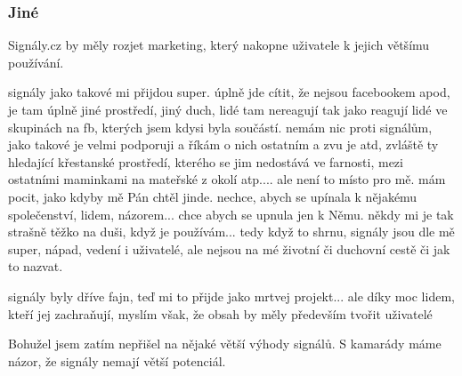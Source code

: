 \subsubsection{Jiné}

Signály.cz by měly rozjet marketing, který nakopne uživatele k jejich většímu používání.

signály jako takové mi přijdou super. úplně jde cítit, že nejsou facebookem apod, je tam úplně jiné prostředí, jiný duch, lidé tam nereagují tak jako reagují lidé ve skupinách na fb, kterých jsem kdysi byla součástí. nemám nic proti signálům, jako takové je velmi podporuji a říkám o nich ostatním a zvu je atd, zvláště ty hledající křestanské prostředí, kterého se jim nedostává ve farnosti, mezi ostatními maminkami na mateřské z okolí atp.... ale není to místo pro mě. mám pocit, jako kdyby mě Pán chtěl jinde. nechce, abych se upínala k nějakému společenství, lidem, názorem... chce abych se upnula jen k Němu. někdy mi je tak strašně těžko na duši, když je používám... tedy když to shrnu, signály jsou dle mě super, nápad, vedení i uživatelé, ale nejsou na mé životní či duchovní cestě či jak to nazvat.

signály byly dříve fajn, teď mi to přijde jako mrtvej projekt... ale díky moc lidem, kteří jej zachraňují, myslím však, že obsah by měly především tvořit uživatelé

Bohužel jsem zatím nepřišel na nějaké větší výhody signálů. S kamarády máme názor, že signály nemají větší potenciál.

\setlength{\parskip}{0cm}
